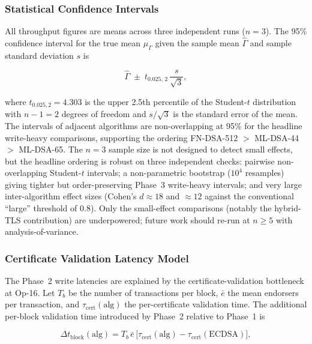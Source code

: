\documentclass{ieeetj}
\begin{document}
\subsubsection{Statistical Confidence Intervals}

All throughput figures are means across three independent runs ($n=3$). The 95\%
confidence interval for the true mean $\mu_\Gamma$ given the sample mean
$\hat{\Gamma}$ and sample standard deviation $s$ is

\begin{equation}
\hat{\Gamma}\;\pm\;t_{0.025,\,2}\,\frac{s}{\sqrt{3}},
\label{eq:tps_ci}
\end{equation}

where $t_{0.025,2}=4.303$ is the upper 2.5th percentile of the Student-$t$
distribution with $n-1=2$ degrees of freedom and $s/\sqrt{3}$ is the standard
error of the mean. The intervals of adjacent algorithms are non-overlapping at
95\% for the headline write-heavy comparisons, supporting the ordering
FN-DSA-512 $>$ ML-DSA-44 $>$ ML-DSA-65. The $n=3$ sample size is not designed to
detect small effects, but the headline ordering is robust on three independent
checks: pairwise non-overlapping Student-$t$ intervals; a non-parametric bootstrap
($10^4$ resamples) giving tighter but order-preserving Phase~3 write-heavy
intervals; and very large inter-algorithm effect sizes (Cohen's $d\approx18$ and
$\approx12$ against the conventional ``large'' threshold of 0.8). Only the
small-effect comparisons (notably the hybrid-TLS contribution) are underpowered;
future work should re-run at $n\ge5$ with analysis-of-variance.

\subsubsection{Certificate Validation Latency Model}

The Phase~2 write latencies are explained by the certificate-validation
bottleneck at Op-16. Let $T_b$ be the number of transactions per block,
$\bar{e}$ the mean endorsers per transaction, and
$\tau_{\mathrm{cert}}(\mathrm{alg})$ the per-certificate validation time. The
additional per-block validation time introduced by Phase~2 relative to Phase~1 is

\begin{equation}
\Delta t_{\mathrm{block}}(\mathrm{alg})
= T_b\,\bar{e}\,
\bigl[\tau_{\mathrm{cert}}(\mathrm{alg})-\tau_{\mathrm{cert}}(\mathrm{ECDSA})\bigr],
\label{eq:cert_latency}
\end{equation}
\end{document}
